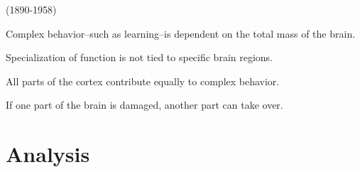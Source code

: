 \begin{coloredlist}
    \item {}
    \begin{coloredlist}
        \item {} (1890-1958)
        \begin{coloredlist}
            \item {}
            \begin{coloredlist}
                \item Complex behavior--such as learning--is dependent on the total mass of the brain.
            \end{coloredlist}
            \item {}
            \begin{coloredlist}
                \item Specialization of function is not tied to specific brain regions.
                \item All parts of the cortex contribute equally to complex behavior.
            \end{coloredlist}
            \item {}
            \begin{coloredlist}
                \item If one part of the brain is damaged, another part can take over.
            \end{coloredlist}
        \end{coloredlist}
    \end{coloredlist}
\end{coloredlist}

\section{Analysis}

